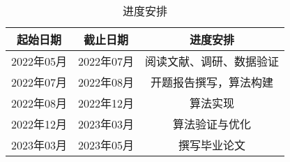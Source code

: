 \begin{table}[htbp]
	\centering
	\caption{进度安排}\label{table:jinduanpai}
	\vspace{0.5em}\wuhao
	\begin{tabularx}{1\textwidth}{ccc}
		\toprule
		起始日期        & 截止日期     & 进度安排    \\
		\midrule
		2022年05月           & 2022年07月           & 阅读文献、调研、数据验证      \\
		2022年07月          & 2022年08月  & 开题报告撰写，算法构建  \\
		2022年08月         & 2022年12月   & 算法实现  \\
		2022年12月           & 2023年03月  & 算法验证与优化 \\
		2023年03月          & 2023年05月 &      撰写毕业论文     \\


		\bottomrule
	\end{tabularx}
\end{table}


\FloatBarrier
